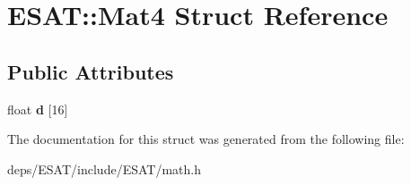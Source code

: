 \hypertarget{struct_e_s_a_t_1_1_mat4}{}\section{E\+S\+AT\+:\+:Mat4 Struct Reference}
\label{struct_e_s_a_t_1_1_mat4}
\subsection*{Public Attributes}
\begin{DoxyCompactItemize}
\item 
\mbox{\label{struct_e_s_a_t_1_1_mat4_ab4dafd527900868b3a5dcc27ca583755}} 
float {\bfseries d} \mbox{[}16\mbox{]}
\end{DoxyCompactItemize}


The documentation for this struct was generated from the following file\+:\begin{DoxyCompactItemize}
\item 
deps/\+E\+S\+A\+T/include/\+E\+S\+A\+T/math.\+h\end{DoxyCompactItemize}

